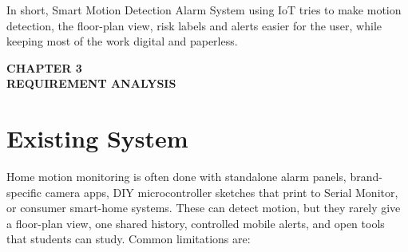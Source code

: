 \documentclass[12pt,a4paper]{report}
\begin{document}
In short, Smart Motion Detection Alarm System using IoT tries to make motion detection, the floor-plan view, risk labels and alerts easier for the user, while keeping most of the work digital and paperless.



\cleardoublepage
\thispagestyle{empty}

\null
\vfill

\begin{center}
    {\fontsize{16pt}{18pt}\selectfont\bfseries
    CHAPTER 3}\\[0.5cm]

    {\fontsize{16pt}{18pt}\selectfont\bfseries
    REQUIREMENT ANALYSIS}
\end{center}

\vfill
\null

\clearpage

\section{Existing System}

Home motion monitoring is often done with standalone alarm panels, brand-specific camera apps, DIY microcontroller sketches that print to Serial Monitor, or consumer smart-home systems. These can detect motion, but they rarely give a floor-plan view, one shared history, controlled mobile alerts, and open tools that students can study. Common limitations are:
\end{document}
